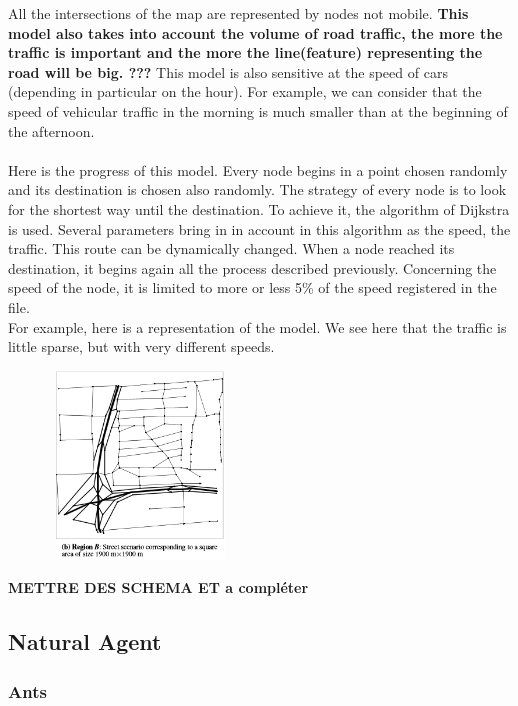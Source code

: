 All the intersections of the map are represented by nodes not mobile.
\textbf{This model also takes into account the volume of road traffic, the more the traffic is important and the more the line(feature) representing the road will be big. ???}
This model is also sensitive at the speed of cars (depending in particular on the hour). For example, we can consider that the speed of vehicular traffic in the morning is much smaller than at the beginning of the afternoon.
\\\\
Here is the progress of this model. Every node begins in a point chosen randomly and its destination is chosen also randomly. The strategy of every node is to look for the shortest way until the destination. To achieve it, the algorithm of Dijkstra is used. Several parameters bring in in account in this algorithm as the speed, the traffic. This route can be dynamically changed. When a node reached its destination, it begins again all the process described previously. Concerning the speed of the node, it is limited to more or less 5\% of the speed registered in the file.
\\
For example, here is a representation of the model. We see here that the traffic is little sparse, but with very different speeds.

\begin{center}
\includegraphics[width=7cm,height=50mm]{../images/city.png}
\end{center}



\textbf{METTRE DES SCHEMA ET a compléter}

\subsection{Natural Agent}

\subsubsection{Ants}

